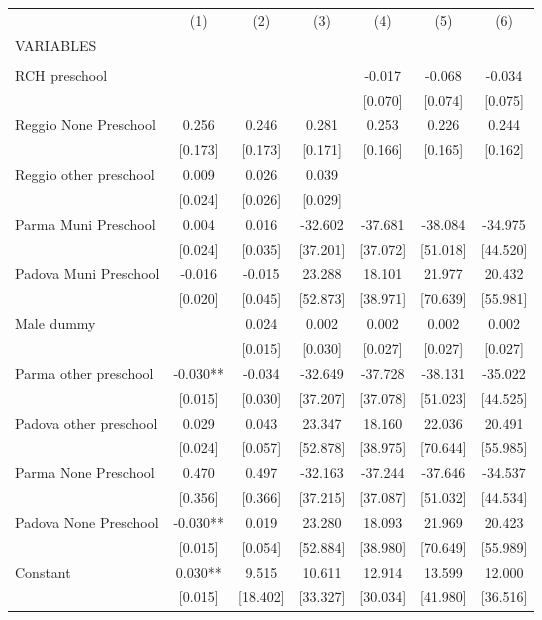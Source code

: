\begin{tabular}{lcccccc} \hline
 & (1) & (2) & (3) & (4) & (5) & (6) \\
VARIABLES &  &  &  &  &  &  \\ \hline
 &  &  &  &  &  &  \\
RCH preschool &  &  &  & -0.017 & -0.068 & -0.034 \\
 &  &  &  & [0.070] & [0.074] & [0.075] \\
Reggio None Preschool & 0.256 & 0.246 & 0.281 & 0.253 & 0.226 & 0.244 \\
 & [0.173] & [0.173] & [0.171] & [0.166] & [0.165] & [0.162] \\
Reggio other preschool & 0.009 & 0.026 & 0.039 &  &  &  \\
 & [0.024] & [0.026] & [0.029] &  &  &  \\
Parma Muni Preschool & 0.004 & 0.016 & -32.602 & -37.681 & -38.084 & -34.975 \\
 & [0.024] & [0.035] & [37.201] & [37.072] & [51.018] & [44.520] \\
Padova Muni Preschool & -0.016 & -0.015 & 23.288 & 18.101 & 21.977 & 20.432 \\
 & [0.020] & [0.045] & [52.873] & [38.971] & [70.639] & [55.981] \\
Male dummy &  & 0.024 & 0.002 & 0.002 & 0.002 & 0.002 \\
 &  & [0.015] & [0.030] & [0.027] & [0.027] & [0.027] \\
Parma other preschool & -0.030** & -0.034 & -32.649 & -37.728 & -38.131 & -35.022 \\
 & [0.015] & [0.030] & [37.207] & [37.078] & [51.023] & [44.525] \\
Padova other preschool & 0.029 & 0.043 & 23.347 & 18.160 & 22.036 & 20.491 \\
 & [0.024] & [0.057] & [52.878] & [38.975] & [70.644] & [55.985] \\
Parma None Preschool & 0.470 & 0.497 & -32.163 & -37.244 & -37.646 & -34.537 \\
 & [0.356] & [0.366] & [37.215] & [37.087] & [51.032] & [44.534] \\
Padova None Preschool & -0.030** & 0.019 & 23.280 & 18.093 & 21.969 & 20.423 \\
 & [0.015] & [0.054] & [52.884] & [38.980] & [70.649] & [55.989] \\
Constant & 0.030** & 9.515 & 10.611 & 12.914 & 13.599 & 12.000 \\
 & [0.015] & [18.402] & [33.327] & [30.034] & [41.980] & [36.516] \\

\end{tabular}
